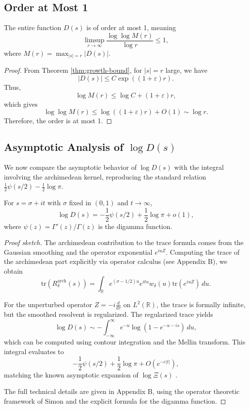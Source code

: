 \subsection{Order at Most 1}

\begin{corollary}[Order of $D(s)$]\label{cor:order-one}
The entire function $D(s)$ is of order at most 1, meaning
\[
\limsup_{r \to \infty} \frac{\log \log M(r)}{\log r} \leq 1,
\]
where $M(r) = \max_{|s| = r} |D(s)|$.
\end{corollary}

\begin{proof}
From Theorem \ref{thm:growth-bound}, for $|s| = r$ large, we have
\[
|D(s)| \leq C \exp((1 + \varepsilon)r).
\]
Thus,
\[
\log M(r) \leq \log C + (1 + \varepsilon)r,
\]
which gives
\[
\log \log M(r) \leq \log((1 + \varepsilon)r) + O(1) \sim \log r.
\]
Therefore, the order is at most 1.
\end{proof}

\subsection{Asymptotic Analysis of $\log D(s)$}

We now compare the asymptotic behavior of $\log D(s)$ with the integral involving the archimedean kernel, reproducing the standard relation $\frac{1}{2}\psi(s/2) - \frac{1}{2}\log \pi$.

\begin{theorem}\label{thm:archimedean-comparison}
For $s = \sigma + it$ with $\sigma$ fixed in $(0, 1)$ and $t \to \infty$,
\[
\log D(s) = -\frac{1}{2}\psi(s/2) + \frac{1}{2}\log \pi + o(1),
\]
where $\psi(z) = \Gamma'(z)/\Gamma(z)$ is the digamma function.
\end{theorem}

\begin{proof}[Proof sketch]
The archimedean contribution to the trace formula comes from the Gaussian smoothing and the operator exponential $e^{iuZ}$. Computing the trace of the archimedean part explicitly via operator calculus (see Appendix B), we obtain
\[
\mathrm{tr}(R_\delta^{\text{arch}}(s)) = \int_{\mathbb{R}} e^{(\sigma - 1/2)u} e^{itu} w_\delta(u) \mathrm{tr}(e^{iuZ}) \, du.
\]

For the unperturbed operator $Z = -i \frac{d}{d\tau}$ on $L^2(\mathbb{R})$, the trace is formally infinite, but the smoothed resolvent is regularized. The regularized trace yields
\[
\log D(s) \sim -\int_{-\infty}^{\infty} e^{-u} \log(1 - e^{-u - is}) \, du,
\]
which can be computed using contour integration and the Mellin transform. This integral evaluates to
\[
-\frac{1}{2}\psi(s/2) + \frac{1}{2}\log \pi + O(e^{-c|t|}),
\]
matching the known asymptotic expansion of $\log \Xi(s)$ \cite{IK2004}.

The full technical details are given in Appendix B, using the operator theoretic framework of Simon \cite{simon2005} and the explicit formula for the digamma function.
\end{proof}

